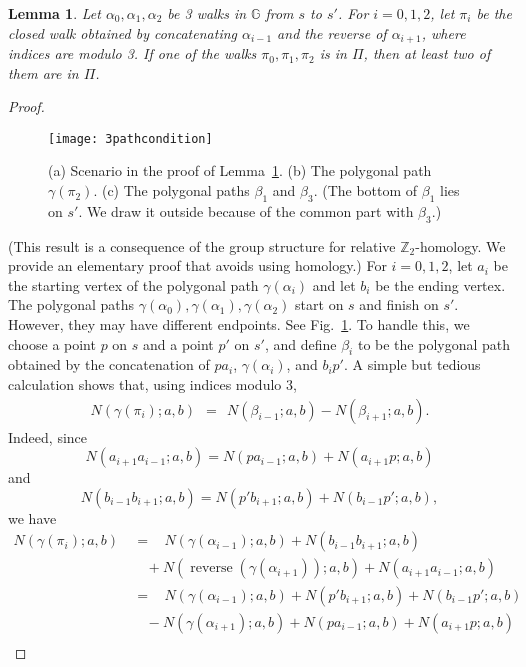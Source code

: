 \documentclass[11pt,a4paper]{article}
\newtheorem{lemma}[definition]{Lemma}
\def\ZZ{\ensuremath{\mathbb{Z}}}
\def\I{\ensuremath{\mathbb{G}}}
\DeclareMathOperator{\reverse}{reverse}
\begin{document}
\begin{lemma}\label{le:3-path}
	Let $\alpha_0,\alpha_1,\alpha_2$ be 3 walks in $\I$ from $s$ to $s'$. For $i=0,1,2$,
	let $\pi_i$ be the closed walk obtained by concatenating $\alpha_{i-1}$ and the reverse of $\alpha_{i+1}$,
	where indices are modulo 3.
	If one of the walks $\pi_0,\pi_1,\pi_2$ is in $\Pi$, then at least two of them are in $\Pi$.
\end{lemma}
\begin{proof}
	\begin{figure}
	\centering
		\texttt{[image: 3pathcondition]}
		\caption{(a) Scenario in the proof of Lemma~\ref{le:3-path}.
			(b) The polygonal path $\gamma(\pi_2)$.
            (c) The polygonal paths $\beta_1$ and $\beta_3$. (The bottom of $\beta_1$ lies on $s'$. We draw it outside because of the common part with $\beta_3$.)}
	\label{fig:3pathcondition}
	\end{figure}
	(This result is a consequence of the group structure for relative $\ZZ_2$-homology. 
	We provide an elementary proof that avoids using homology.)
	For $i=0,1,2$, let $a_i$ be the starting vertex of the polygonal path $\gamma(\alpha_i)$
	and let $b_i$ be the ending vertex.
	The polygonal paths $\gamma(\alpha_0),\gamma(\alpha_1),\gamma(\alpha_2)$ 
	start on $s$ and finish on $s'$.
	However, they may have different endpoints.
	See Fig.~\ref{fig:3pathcondition}.
	To handle this, we choose a point $p$ on $s$ and a point $p'$ on $s'$,
	and define $\beta_i$ to be the polygonal path obtained
	by the concatenation of $pa_i$, $\gamma(\alpha_i)$, and $b_ip'$. 
A simple but tedious calculation shows that, using indices modulo 3,
	\begin{align*}
		N(\gamma(\pi_i);a,b)~~=~~ N(\beta_{i-1};a,b)- N(\beta_{i+1};a,b).
	\end{align*}
	Indeed, since
	\[
		N(a_{i+1} a_{i-1};a,b)= N(p a_{i-1};a,b) + N(a_{i+1}p ;a,b)
	\]
	and 
	\[
		N(b_{i-1} b_{i+1};a,b)= N(p' b_{i+1};a,b) + N(b_{i-1}p';a,b),
	\]
	we have 
	\begin{align*}
		N(\gamma(\pi_i);a,b)~&=~~~~ N(\gamma(\alpha_{i-1}) ;a,b) 
							+ N(b_{i-1}b_{i+1};a,b) \\
							& ~~~~ + N(\reverse (\gamma(\alpha_{i+1}));a,b) 
							+ N(a_{i+1} a_{i-1};a,b)\\
							&=~~~~ N(\gamma(\alpha_{i-1}) ;a,b) 
							+ N(p' b_{i+1};a,b) + N(b_{i-1}p';a,b) \\
							& ~~~~ - N(\gamma(\alpha_{i+1});a,b) 
							+ N(p a_{i-1};a,b) + N(a_{i+1}p ;a,b)\\

\end{align*}
\end{proof}
\end{document}
